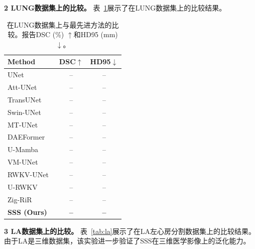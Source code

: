 \documentclass[conference]{IEEEtran}   %
\begin{document}
\textbf{2 LUNG数据集上的比较。}
表~\ref{tab:lung}展示了在LUNG数据集上的比较结果。

\begin{table}[t]
\centering
\caption{在LUNG数据集上与最先进方法的比较。报告DSC (\%) $\uparrow$和HD95 (mm) $\downarrow$。}
\label{tab:lung}
\begin{tabular}{lcc}
\toprule
Method & DSC$\uparrow$ & HD95$\downarrow$ \\
\midrule
UNet~\cite{Unet}              & --    & --    \\
Att-UNet~\cite{attetion-unet} & --    & --    \\
TransUNet~\cite{transunet}    & --    & --    \\
Swin-UNet~\cite{swinunet}     & --    & --    \\
MT-UNet~\cite{mtUNet}         & --    & --    \\
DAEFormer~\cite{daeformer}    & --    & --    \\
U-Mamba~\cite{umamba}         & --    & --    \\
VM-UNet~\cite{vmunet}         & --    & --    \\
RWKV-UNet~\cite{RWKV-UNet}   & --    & --    \\
U-RWKV~\cite{urwkv}          & --    & --    \\
Zig-RiR~\cite{zigrir}        & --    & --    \\
\midrule
\textbf{SSS (Ours)}          & \textbf{--} & \textbf{--} \\
\bottomrule
\end{tabular}
\end{table}

\textbf{3 LA数据集上的比较。}
表~\ref{tab:la}展示了在LA左心房分割数据集上的比较结果。
由于LA是三维数据集，该实验进一步验证了SSS在三维医学影像上的泛化能力。
\end{document}
